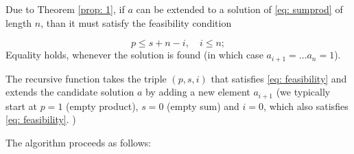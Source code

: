 \documentclass[10pt]{article}
\theoremstyle{definition}
\theoremstyle{remark}
\numberwithin{equation}{section}
\begin{document}
Due to Theorem \ref{prop: 1}, if $a$ can be extended to a solution of \eqref{eq: sumprod} of length $n$, than it must satisfy the feasibility condition

\begin{equation}\label{eq: feasibility}
p \leq s + n - i, \quad i\leq n;
\end{equation}
Equality holds, whenever the solution is found (in which case $a_{i+1}=\dots a_{n}=1$).

The recursive function takes the triple $(p, s, i)$ that satisfies \eqref{eq: feasibility} and extends the candidate solution $a$ by adding a new element $a_{i+1}$ (we typically start at $p=1$ (empty product), $s=0$ (empty sum) and $i=0$, which also satisfies \eqref{eq: feasibility}. )

The algorithm proceeds as follows:
\end{document}
